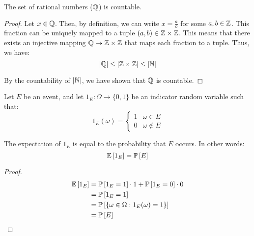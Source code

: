 \documentclass[name=Jacob\ Strieb, andrewid=jstrieb, course=69-420, num=8]{homework}
\begin{document}
    

\begin{claim}
    The set of rational numbers ($\mathbb{Q}$) is countable.
\end{claim}
\begin{proof}
    Let $x \in \mathbb{Q}$. Then, by definition, we can write $x = \frac{a}{b}$ for some $a, b \in \mathbb{Z}$. This fraction can be uniquely mapped to a tuple $(a, b) \in \mathbb{Z} \times \mathbb{Z}$. This means that there exists an injective mapping $\mathbb{Q} \to \mathbb{Z} \times \mathbb{Z}$ that maps each fraction to a tuple. Thus, we have:
    $$ |\mathbb{Q}| \leq |\mathbb{Z} \times \mathbb{Z}| \leq |\mathbb{N}| $$
    
    By the countability of $|\mathbb{N}|$, we have shown that $\mathbb{Q}$ is countable.
\end{proof}
\newpage

Let $E$ be an event, and let $1_E : \Omega \to \{ 0, 1 \}$ be an indicator random variable such that:
$$ 1_E(\omega) = \begin{cases}
1 & \omega \in E \\
0 & \omega \notin E
\end{cases} $$

\begin{claim}
    The expectation of $1_E$ is equal to the probability that $E$ occurs. In other words:
    $$ \mathbb{E}\left[ 1_E \right] = \mathbb{P}\left[ E \right] $$
\end{claim}
\begin{proof}
    \begin{align*}
    \mathbb{E}\left[ 1_E \right] &= \mathbb{P}\left[ 1_E = 1 \right] \cdot 1 + \mathbb{P}\left[ 1_E = 0 \right] \cdot 0 \\
    &= \mathbb{P}\left[ 1_E = 1 \right] \\
    &= \mathbb{P}\left[  \{ \omega \in \Omega : 1_E(\omega) = 1 \}  \right] \\
    &= \mathbb{P}\left[ E \right]
    \end{align*}
\end{proof}
\newpage

\end{document}
